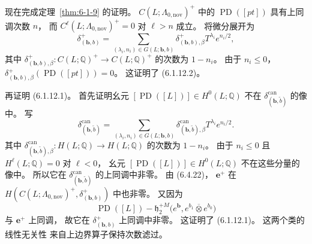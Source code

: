 现在完成定理~\ref{thm:6-1-9} 的证明。
$C(L;\Lambda_{0,\mathrm{nov}})^+$
中的 $\operatorname{PD}([pt])$
具有上同调次数 $n$，
而 $C^\ell(L;\Lambda_{0,\mathrm{nov}})^+=0$
对 $\ell>n$ 成立。
将微分展开为
\[
\delta^+_{(\boldsymbol b,b)}
=\sum_{(\lambda_i,n_i)\in G(L;\boldsymbol b,b)}
\delta^+_{(\boldsymbol b,b),\beta}
T^{\lambda_i}e^{n_i/2},
\]
其中
$\delta^+_{(\boldsymbol b,b),\beta}:
C(L;\mathbb Q)^+\to C(L;\mathbb Q)^+$
的次数为 $1-n_i$。
由于 $n_i\le0$，
$\delta^+_{(\boldsymbol b,b),\beta}
(\operatorname{PD}([pt]))=0$。
这证明了 (6.1.12.2)。

再证明 (6.1.12.1)。
首先证明幺元
$[\operatorname{PD}([L])]
\in H^0(L;\mathbb Q)$
不在
$\delta^{\mathrm{can}}_{(\boldsymbol b,\widetilde b)}$
的像中。
写
\[
\delta^{\mathrm{can}}_{(\boldsymbol b,\widetilde b)}
=\sum_{(\lambda_i,n_i)\in G(L;\boldsymbol b,b)}
\delta^{\mathrm{can}}_{(\boldsymbol b,\widetilde b),\beta}
T^{\lambda_i}e^{n_i/2}.
\]
其中
$\delta^{\mathrm{can}}_{(\boldsymbol b,\widetilde b),\beta}:
H(L;\mathbb Q)\to H(L;\mathbb Q)$
的次数为 $1-n_i$。
由于 $n_i\le0$ 且
$H^\ell(L;\mathbb Q)=0$ 对 $\ell<0$，
幺元
$[\operatorname{PD}([L])]
\in H^0(L;\mathbb Q)$
不在这些分量的像中。
所以它在
$\delta^{\mathrm{can}}_{(\boldsymbol b,\widetilde b)}$
的上同调中非零。
由 (6.4.22)，
$\mathbf e^+$ 在
$H(C(L;\Lambda_{0,\mathrm{nov}})^+,
\delta^+_{(\boldsymbol b,b)})$
中也非零。
又因为
\[
\operatorname{PD}([L])
-\mathfrak h_2^{+M}
\bigl(e^{\boldsymbol b},
e^{b_1}\mathbin{\overline\otimes}e^{b_0}\bigr)
\]
与 $\mathbf e^+$ 上同调，
故它在
$\delta^+_{(\boldsymbol b,b)}$
上同调中非零。
这证明了 (6.1.12.1)。
这两个类的线性无关性
来自上边界算子保持次数滤过。

